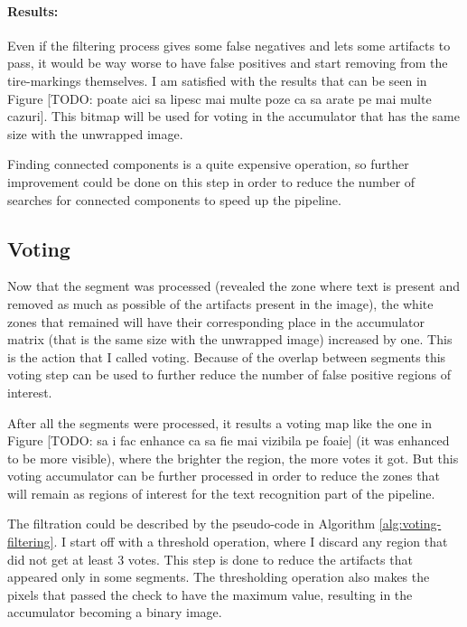 \paragraph*{Results:}\mbox{}\par
Even if the filtering process gives some false negatives and lets some artifacts to pass, it would be way worse to have false positives and start removing from the tire-markings themselves. I am satisfied with the results that can be seen in Figure [TODO: poate aici sa lipesc mai multe poze ca sa arate pe mai multe cazuri]. This bitmap will be used for voting in the accumulator that has the same size with the unwrapped image.

Finding connected components is a quite expensive operation, so further improvement could be done on this step in order to reduce the number of searches for connected components to speed up the pipeline.

\subsection{Voting}

Now that the segment was processed (revealed the zone where text is present and removed as much as possible of the artifacts present in the image), the white zones that remained will have their corresponding place in the accumulator matrix (that is the same size with the unwrapped image) increased by one. This is the action that I called voting. Because of the overlap between segments this voting step can be used to further reduce the number of false positive regions of interest.

After all the segments were processed, it results a voting map like the one in Figure [TODO: sa i fac enhance ca sa fie mai vizibila pe foaie] (it was enhanced to be more visible), where the brighter the region, the more votes it got. But this voting accumulator can be further processed in order to reduce the zones that will remain as regions of interest for the text recognition part of the pipeline.

The filtration could be described by the pseudo-code in Algorithm \ref{alg:voting-filtering}. I start off with a threshold operation, where I discard any region that did not get at least 3 votes. This step is done to reduce the artifacts that appeared only in some segments. The thresholding operation also makes the pixels that passed the check to have the maximum value, resulting in the accumulator becoming a binary image.

